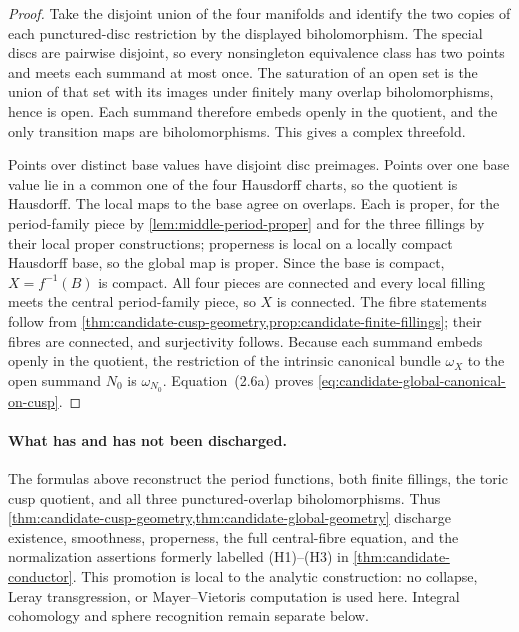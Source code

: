 \begin{proof}
Take the disjoint union of the four manifolds and identify the two copies of
each punctured-disc restriction by the displayed biholomorphism.  The special
discs are pairwise disjoint, so every nonsingleton equivalence class has two
points and meets each summand at most once.  The saturation of an open set is
the union of that set with its images under finitely many overlap
biholomorphisms, hence is open.  Each summand therefore embeds openly in the
quotient, and the only transition maps are biholomorphisms.  This gives a
complex threefold.

Points over distinct base values have disjoint disc preimages.  Points over
one base value lie in a common one of the four Hausdorff charts, so the
quotient is Hausdorff.  The local maps to the base agree on overlaps.  Each
is proper, for the period-family piece by
\cref{lem:middle-period-proper} and for the three fillings by their local
proper constructions; properness is local on a locally compact Hausdorff base, so the
global map is proper.  Since the base is compact, \(X=f^{-1}(B)\) is compact.
All four pieces are connected and every local filling meets the central
period-family piece, so \(X\) is connected.  The fibre statements follow
from \cref{thm:candidate-cusp-geometry,prop:candidate-finite-fillings}; their
fibres are connected, and surjectivity follows.
Because each summand embeds openly in the quotient, the restriction of the
intrinsic canonical bundle \(\omega_X\) to the open summand \(N_0\) is
\(\omega_{N_0}\).  Equation~(2.6a) proves
\cref{eq:candidate-global-canonical-on-cusp}.
\end{proof}

\paragraph{What has and has not been discharged.}
The formulas above reconstruct the period functions, both finite fillings,
the toric cusp quotient, and all three punctured-overlap biholomorphisms.
Thus \cref{thm:candidate-cusp-geometry,thm:candidate-global-geometry}
discharge existence, smoothness, properness,
the full central-fibre equation, and the normalization assertions formerly
labelled (H1)--(H3) in \cref{thm:candidate-conductor}.  This promotion is
local to the analytic construction: no collapse, Leray transgression, or
Mayer--Vietoris computation is used here.  Integral cohomology and sphere
recognition remain separate below.
